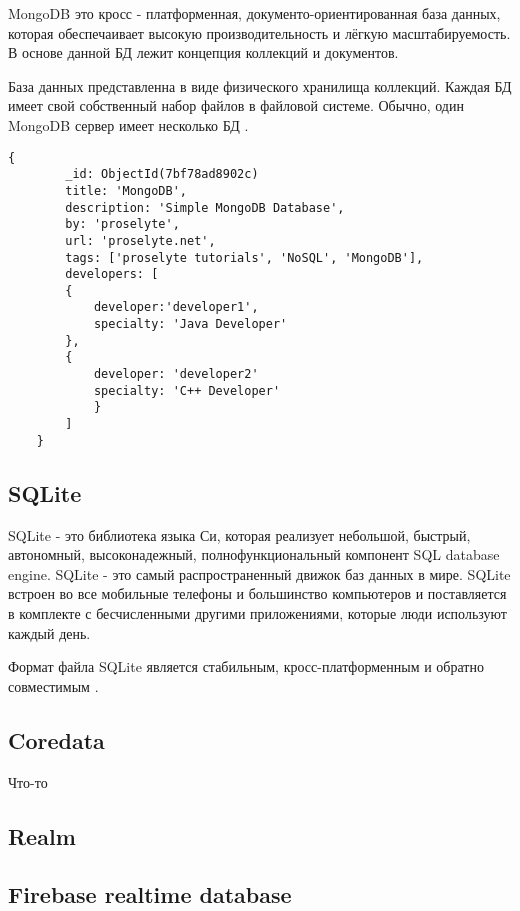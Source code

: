 \documentclass[12pt, a4paper]{report}
\begin{document}
	\hspace{0.7 cm}MongoDB это кросс - платформенная, документо-ориентированная база данных, которая обеспечаивает высокую производительность и лёгкую масштабируемость. В основе данной БД лежит  концепция коллекций и документов.
	
	База данных представленна в виде физического хранилища коллекций. Каждая БД имеет свой собственный набор файлов в файловой системе. Обычно, один MongoDB сервер имеет несколько БД \cite{mongodb}.
	
	\begin{lstlisting}[label=monogdb-document,caption=Пример документа в базе данных Mongo]
	{
		_id: ObjectId(7bf78ad8902c)
		title: 'MongoDB', 
		description: 'Simple MongoDB Database',
		by: 'proselyte',
		url: 'proselyte.net',
		tags: ['proselyte tutorials', 'NoSQL', 'MongoDB'], 
		developers: [	
		{
			developer:'developer1',
			specialty: 'Java Developer'
		},
		{
			developer: 'developer2'
			specialty: 'C++ Developer'
			}
		]
	}
	\end{lstlisting}
	
	
	\subsection{SQLite}
	
	\hspace{0.7 cm}SQLite - это библиотека языка Си, которая реализует небольшой, быстрый, автономный, высоконадежный, полнофункциональный компонент SQL database engine. SQLite - это самый распространенный движок баз данных в мире. SQLite встроен во все мобильные телефоны и большинство компьютеров и поставляется в комплекте с бесчисленными другими приложениями, которые люди используют каждый день.
	
	Формат файла SQLite является стабильным, кросс-платформенным и обратно совместимым \cite{sqlite}.
	
	\subsection{Coredata}
	
	\hspace{0.7 cm}Что-то \cite{coredata}
	
	\subsection{Realm}
	
	\subsection{Firebase realtime database}
	
\end{document}
